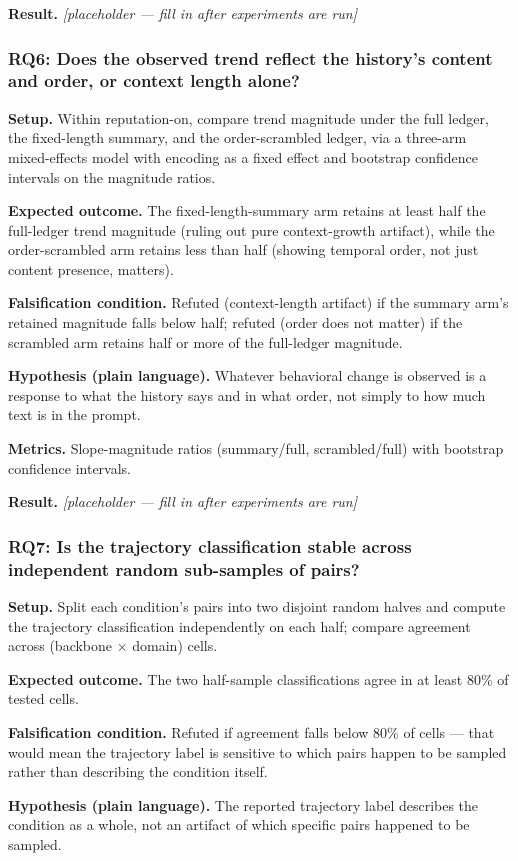 \documentclass[11pt]{article}
\newcommand{\ph}{\textit{[placeholder --- fill in after experiments are run]}}
\begin{document}
\textbf{Result.} \ph

\subsubsection{RQ6: Does the observed trend reflect the history's content and order, or context length alone?}
\textbf{Setup.} Within reputation-on, compare trend magnitude under the full ledger, the fixed-length summary, and the order-scrambled ledger, via a three-arm mixed-effects model with encoding as a fixed effect and bootstrap confidence intervals on the magnitude ratios.

\textbf{Expected outcome.} The fixed-length-summary arm retains at least half the full-ledger trend magnitude (ruling out pure context-growth artifact), while the order-scrambled arm retains less than half (showing temporal order, not just content presence, matters).

\textbf{Falsification condition.} Refuted (context-length artifact) if the summary arm's retained magnitude falls below half; refuted (order does not matter) if the scrambled arm retains half or more of the full-ledger magnitude.

\textbf{Hypothesis (plain language).} Whatever behavioral change is observed is a response to what the history says and in what order, not simply to how much text is in the prompt.

\textbf{Metrics.} Slope-magnitude ratios (summary/full, scrambled/full) with bootstrap confidence intervals.

\textbf{Result.} \ph

\subsubsection{RQ7: Is the trajectory classification stable across independent random sub-samples of pairs?}
\textbf{Setup.} Split each condition's pairs into two disjoint random halves and compute the trajectory classification independently on each half; compare agreement across (backbone $\times$ domain) cells.

\textbf{Expected outcome.} The two half-sample classifications agree in at least 80\% of tested cells.

\textbf{Falsification condition.} Refuted if agreement falls below 80\% of cells --- that would mean the trajectory label is sensitive to which pairs happen to be sampled rather than describing the condition itself.

\textbf{Hypothesis (plain language).} The reported trajectory label describes the condition as a whole, not an artifact of which specific pairs happened to be sampled.
\end{document}
